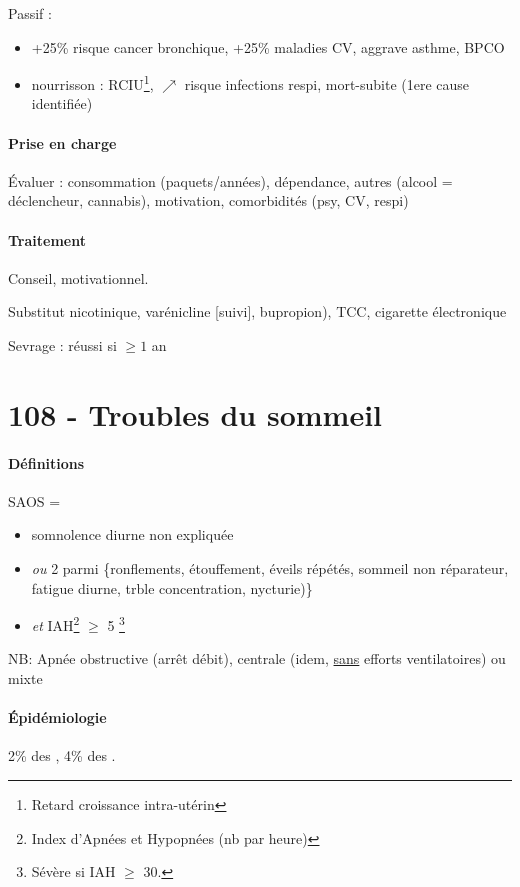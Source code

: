 \documentclass{book}
\begin{document}
Passif :
\begin{itemize}
\item +25\% risque cancer bronchique, +25\% maladies CV, aggrave asthme, BPCO
\item nourrisson : RCIU\footnote{Retard croissance intra-utérin}, \(\nearrow\) risque
infections respi, mort-subite (1ere cause identifiée)
\end{itemize}

\paragraph{Prise en charge}
\label{sec:org369cf05}
Évaluer : consommation (paquets/années), dépendance, autres (alcool = déclencheur,
cannabis), motivation, comorbidités (psy, CV, respi)
\paragraph{Traitement}
\label{sec:org19ed4d1}
Conseil, motivationnel.

Substitut nicotinique, varénicline [\danger suivi], bupropion), TCC, cigarette électronique

Sevrage : réussi si \(\ge 1\) an

\section{108 - Troubles du sommeil}
\label{sec:orgf5e0698}
\paragraph{Définitions}
\label{sec:org57d5b95}
SAOS =
\begin{itemize}
\item somnolence diurne non expliquée
\item \emph{ou} 2 parmi \{ronflements, étouffement, éveils répétés, sommeil non réparateur, fatigue diurne, trble concentration, nycturie)\}
\item \emph{et} IAH\footnote{Index d'Apnées et Hypopnées (nb par heure)} \(\ge\) 5 \footnote{Sévère si IAH \(\ge\) 30.}
\end{itemize}
NB: Apnée obstructive (arrêt débit), centrale (idem, \uline{sans} efforts ventilatoires) ou mixte

\paragraph{Épidémiologie}
\label{sec:org98bd898}
2\% des \female, 4\% des \male.
\end{document}
